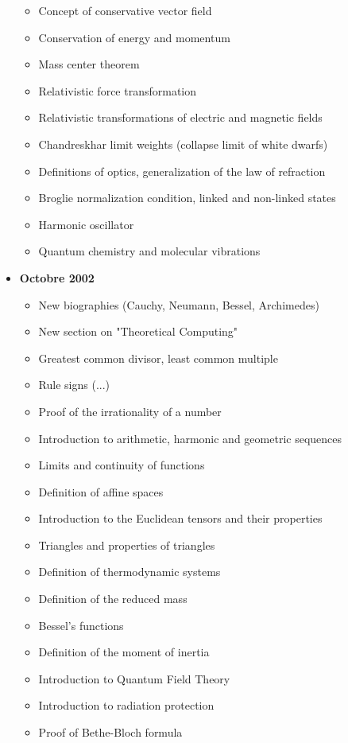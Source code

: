 \documentclass[12pt,a4paper,twoside,openright]{report}
\theoremstyle{definition}
\theoremstyle{itexmp}
\numberwithin{equation}{section}
\begin{document}
\begin{itemize}
\begin{itemize}[noitemsep]
				\item Concept of conservative vector field
				\item Conservation of energy and momentum
				\item Mass center theorem
				\item Relativistic force transformation
				\item Relativistic transformations of electric and magnetic fields
				\item Chandreskhar limit weights (collapse limit of white dwarfs)
				\item Definitions of optics, generalization of the law of refraction
				\item Broglie normalization condition, linked and non-linked states
				\item Harmonic oscillator
				\item Quantum chemistry and molecular vibrations
			\end{itemize}
		\item \textbf{Octobre 2002}
			\begin{itemize}[noitemsep]
				\item New biographies (Cauchy, Neumann, Bessel, Archimedes)
				\item New section on "Theoretical Computing"
				\item Greatest common divisor, least common multiple
				\item Rule signs (...)
				\item Proof of the irrationality of a number
				\item Introduction to arithmetic, harmonic and geometric sequences
				\item Limits and continuity of functions
				\item Definition of affine spaces
				\item Introduction to the Euclidean tensors and their properties
				\item Triangles and properties of triangles
				\item Definition of thermodynamic systems
				\item Definition of the reduced mass
				\item Bessel's functions
				\item Definition of the moment of inertia
				\item Introduction to Quantum Field Theory
				\item Introduction to radiation protection
				\item Proof of Bethe-Bloch formula

\end{itemize}
\end{itemize}
\end{document}
